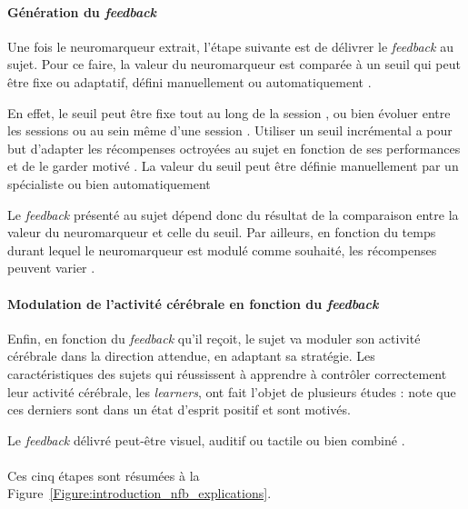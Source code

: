 \paragraph{Génération du \textit{feedback}}
Une fois le neuromarqueur extrait, l'étape suivante est de délivrer le \textit{feedback} au sujet. Pour ce faire, la valeur du neuromarqueur est comparée à un seuil
qui peut être fixe ou adaptatif, défini manuellement ou automatiquement \citep{Arns2014}.

En effet, le seuil peut être fixe tout au long de la session \citep{Kropotov2005, Monastra2002}, ou bien évoluer entre les sessions ou au sein même d'une session \citep{ 
Christiansen2014}. Utiliser un seuil incrémental a pour but d'adapter les récompenses octroyées au sujet en fonction de ses performances et 
de le garder motivé \citep{Bauer2016, Lansbergen2011}. La valeur du seuil peut être définie manuellement par un spécialiste ou bien automatiquement \citep{Arns2014}

Le \textit{feedback} présenté au sujet dépend donc du résultat de la comparaison entre la valeur du neuromarqueur et celle du seuil. Par ailleurs, en fonction du temps durant lequel
le neuromarqueur est modulé comme souhaité, les récompenses peuvent varier \citep{Bioulac2019}. 

\paragraph{Modulation de l'activité cérébrale en fonction du \textit{feedback}}
Enfin, en fonction du \textit{feedback} qu'il reçoit, le sujet va moduler son activité cérébrale dans la direction attendue, en adaptant sa stratégie. 
Les caractéristiques des sujets qui réussissent à apprendre à contrôler correctement leur activité cérébrale, les \textit{learners}, ont fait l'objet de plusieurs études : 
\citet{Friedrich2014} note que ces derniers sont dans un état d'esprit positif et sont motivés. 

Le \textit{feedback} délivré peut-être visuel, auditif ou tactile ou bien combiné \citep{Vernon2004}.
\\
\\
Ces cinq étapes sont résumées à la Figure~\ref{Figure:introduction_nfb_explications}.

